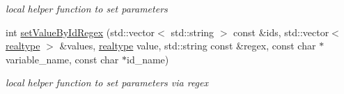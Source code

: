 \begin{DoxyCompactItemize}
\begin{DoxyCompactList}\small\item\em local helper function to set parameters \end{DoxyCompactList}\item 
int \mbox{\hyperlink{namespaceamici_a0094499812e5edffce2ae9f379b11abb}{set\+Value\+By\+Id\+Regex}} (std\+::vector$<$ std\+::string $>$ const \&ids, std\+::vector$<$ \mbox{\hyperlink{namespaceamici_a1bdce28051d6a53868f7ccbf5f2c14a3}{realtype}} $>$ \&values, \mbox{\hyperlink{namespaceamici_a1bdce28051d6a53868f7ccbf5f2c14a3}{realtype}} value, std\+::string const \&regex, const char $\ast$variable\+\_\+name, const char $\ast$id\+\_\+name)
\begin{DoxyCompactList}\small\item\em local helper function to set parameters via regex \end{DoxyCompactList}\end{DoxyCompactItemize}
